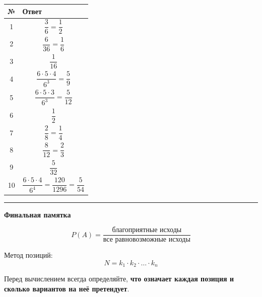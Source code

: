 \documentclass[a4paper,12pt]{article}
\begin{document}
\renewcommand{\arraystretch}{1.45}

\begin{center}
\begin{tabularx}{0.82\linewidth}{@{}cX@{}}
\toprule
\textbf{№} & \textbf{Ответ} \\
\midrule

1 &
\[
\frac{3}{6}=\frac12
\]
\\

2 &
\[
\frac{6}{36}=\frac16
\]
\\

3 &
\[
\frac1{16}
\]
\\

4 &
\[
\frac{6\cdot5\cdot4}{6^3}
=
\frac59
\]
\\

5 &
\[
\frac{6\cdot5\cdot3}{6^3}
=
\frac5{12}
\]
\\

6 &
\[
\frac12
\]
\\

7 &
\[
\frac{2}{8}=\frac14
\]
\\

8 &
\[
\frac{8}{12}=\frac23
\]
\\

9 &
\[
\frac{5}{32}
\]
\\

10 &
\[
\frac{6\cdot5\cdot4}{6^4}
=
\frac{120}{1296}
=
\frac5{54}
\]
\\

\bottomrule
\end{tabularx}
\end{center}

\vfill

\begin{center}
{\color{darkaccent}\rule{0.65\linewidth}{0.7pt}}

\vspace{0.5em}

\textbf{Финальная памятка}

\[
\boxed{
P(A)=\frac{\text{благоприятные исходы}}
{\text{все равновозможные исходы}}
}
\]

\vspace{0.4em}

Метод позиций:
\[
\boxed{
N=k_1\cdot k_2\cdot\ldots\cdot k_n
}
\]

Перед вычислением всегда определяйте,
\textbf{что означает каждая позиция и сколько вариантов на неё претендует}.
\end{center}
\end{document}
